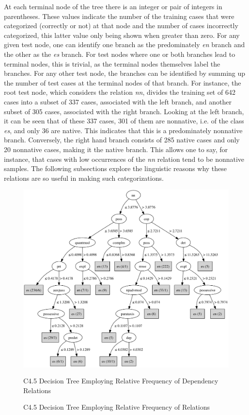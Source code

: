 \documentclass[main.tex]{subfiles}
\begin{document}
At each terminal node of the tree there is an integer or pair of integers in parentheses. These values indicate the number of the training cases that were categorized (correctly or not) at that node and the number of cases incorrectly categorized, this latter value only being shown when greater than zero. For any given test node, one can identify one branch as the predominately \textit{en} branch and the other as the \textit{es} branch. For test nodes where one or both branches lead to terminal nodes, this is trivial, as the terminal nodes themselves label the branches. For any other test node, the branches can be identified by summing up the number of test cases at the terminal nodes of that branch. For instance, the root test node, which considers the relation \textit{nn}, divides the training set of 642 cases into a subset of 337 cases, associated with the left branch, and another subset of 305 cases, associated with the right branch. Looking at the left branch, it can be seen that of these 337 cases, 301 of them are nonnative, i.e. of the class \textit{es}, and only 36 are native. This indicates that this is a predominately nonnative branch. Conversely, the right hand branch consists of 285 native cases and only 20 nonnative cases, making it the native branch. This allows one to say, for instance, that cases with low occurrences of the \textit{nn} relation tend to be nonnative samples. The following subsections explore the linguistic reasons why these relations are so useful in making such categorizations.

\begin{figure}[!b]
\centering
\includegraphics[width=6in]{c45-dep-graph.pdf}
\caption{C4.5 Decision Tree Employing Relative Frequency of Relations}{C4.5 Decision Tree Employing Relative Frequency of Dependency Relations}
\label{fig:c4.5-dep-tree}
\end{figure}
\end{document}
